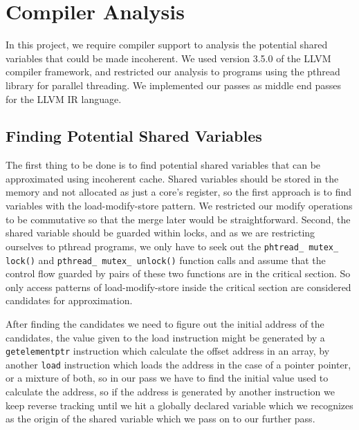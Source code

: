 \documentclass[12pt,conference]{IEEEtran}
\begin{document}
\section{Compiler Analysis} \label{sec:compiler}

In this project, we require compiler support to analysis the potential
shared variables that could be made incoherent. We used version 3.5.0
of the LLVM compiler framework\cite{llvm}, and restricted our analysis
to programs using the pthread library for parallel threading.
We implemented our passes as middle end passes for the LLVM IR language.

\subsection{Finding Potential Shared Variables}

The first thing to be done is to find potential shared variables that
can be approximated using incoherent cache. Shared variables should be
stored in the memory and not allocated as just a core's register, so 
the first approach is to find variables with the load-modify-store
pattern. We restricted our modify operations to be commutative so that
the merge later would be straightforward. Second, the shared variable
should be guarded within locks, and as we are restricting ourselves to
pthread programs, we only have to seek out the 
\texttt{phtread\_ mutex\_ lock()} and \texttt{pthread\_ mutex\_ unlock()} 
function calls and assume that the control flow guarded by pairs of
these two functions are in the critical section. So only access patterns
of load-modify-store inside the critical section are considered candidates
for approximation.

After finding the candidates we need to figure out the initial address of
the candidates, the value given to the load instruction might be generated
by a \texttt{getelementptr} instruction which calculate the offset address
in an array, by another \texttt{load} instruction which loads the address 
in the case of a pointer pointer, or a mixture of both, so in our pass we 
have to find the initial value used to calculate the address, so if the 
address is generated by another instruction we keep reverse tracking until 
we hit a globally declared variable which we recognizes as the origin of the
shared variable which we pass on to our further pass.
\end{document}
